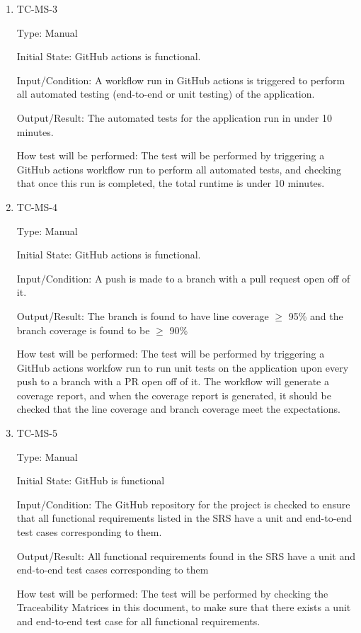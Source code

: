 \documentclass[12pt, titlepage]{article}
\begin{document}
\begin{enumerate}
  \item{TC-MS-3\\}

    Type: Manual

    Initial State: GitHub actions is functional.

    Input/Condition: A workflow run in GitHub actions is triggered to
    perform all automated testing (end-to-end or unit testing) of the
    application.

    Output/Result: The automated tests for the application run in
    under 10 minutes.

    How test will be performed: The test will be performed by
    triggering a GitHub actions workflow run to perform all automated
    tests, and checking that once this run is completed, the total
    runtime is under 10 minutes.

  \item{TC-MS-4\\}

    Type: Manual

    Initial State: GitHub actions is functional.

    Input/Condition: A push is made to a branch with a pull request
    open off of it.

    Output/Result: The branch is found to have line coverage $\ge$ 95\% and
    the branch coverage is found to be $\ge$ 90\%

    How test will be performed: The test will be performed by
    triggering a GitHub actions workfow run to run unit tests on the
    application upon every push to a branch with a PR open off of it.
    The workflow will generate a coverage report, and when the
    coverage report is generated, it should be checked that the line
    coverage and branch coverage meet the expectations.

  \item{TC-MS-5\\}

    Type: Manual

    Initial State: GitHub is functional

    Input/Condition: The GitHub repository for the project is checked
    to ensure that all functional requirements listed in the SRS have
    a unit and end-to-end test cases corresponding to them.

    Output/Result: All functional requirements found in the SRS have a unit
    and end-to-end test cases corresponding to them

    How test will be performed: The test will be performed by
    checking the Traceability Matrices in this document, to make sure
    that there exists a unit and end-to-end test case for all
    functional requirements.


\end{enumerate}
\end{document}

